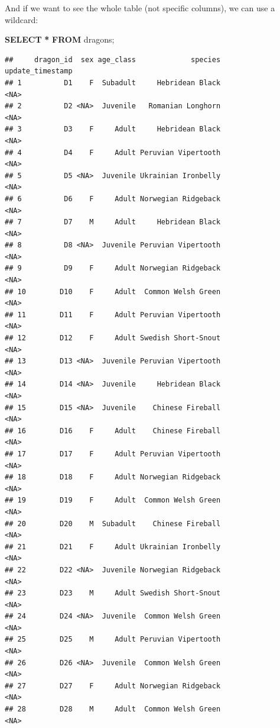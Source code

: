 \documentclass[
]{book}
\newenvironment{Shaded}{\begin{snugshade}}{\end{snugshade}}
\newcommand{\KeywordTok}[1]{\textcolor[rgb]{0.13,0.29,0.53}{\textbf{#1}}}
\newcommand{\NormalTok}[1]{#1}
\newcommand{\OperatorTok}[1]{\textcolor[rgb]{0.81,0.36,0.00}{\textbf{#1}}}
\begin{document}
And if we want to see the whole table (not specific columns), we can use a
wildcard:

\begin{Shaded}
\begin{Highlighting}[]
\KeywordTok{SELECT} \OperatorTok{*} 
\KeywordTok{FROM}\NormalTok{ dragons;}
\end{Highlighting}
\end{Shaded}

\begin{verbatim}
##     dragon_id  sex age_class             species    update_timestamp
## 1          D1    F  Subadult     Hebridean Black                <NA>
## 2          D2 <NA>  Juvenile   Romanian Longhorn                <NA>
## 3          D3    F     Adult     Hebridean Black                <NA>
## 4          D4    F     Adult Peruvian Vipertooth                <NA>
## 5          D5 <NA>  Juvenile Ukrainian Ironbelly                <NA>
## 6          D6    F     Adult Norwegian Ridgeback                <NA>
## 7          D7    M     Adult     Hebridean Black                <NA>
## 8          D8 <NA>  Juvenile Peruvian Vipertooth                <NA>
## 9          D9    F     Adult Norwegian Ridgeback                <NA>
## 10        D10    F     Adult  Common Welsh Green                <NA>
## 11        D11    F     Adult Peruvian Vipertooth                <NA>
## 12        D12    F     Adult Swedish Short-Snout                <NA>
## 13        D13 <NA>  Juvenile Peruvian Vipertooth                <NA>
## 14        D14 <NA>  Juvenile     Hebridean Black                <NA>
## 15        D15 <NA>  Juvenile    Chinese Fireball                <NA>
## 16        D16    F     Adult    Chinese Fireball                <NA>
## 17        D17    F     Adult Peruvian Vipertooth                <NA>
## 18        D18    F     Adult Norwegian Ridgeback                <NA>
## 19        D19    F     Adult  Common Welsh Green                <NA>
## 20        D20    M  Subadult    Chinese Fireball                <NA>
## 21        D21    F     Adult Ukrainian Ironbelly                <NA>
## 22        D22 <NA>  Juvenile Norwegian Ridgeback                <NA>
## 23        D23    M     Adult Swedish Short-Snout                <NA>
## 24        D24 <NA>  Juvenile  Common Welsh Green                <NA>
## 25        D25    M     Adult Peruvian Vipertooth                <NA>
## 26        D26 <NA>  Juvenile  Common Welsh Green                <NA>
## 27        D27    F     Adult Norwegian Ridgeback                <NA>
## 28        D28    M     Adult  Common Welsh Green                <NA>

\end{verbatim}
\end{document}
